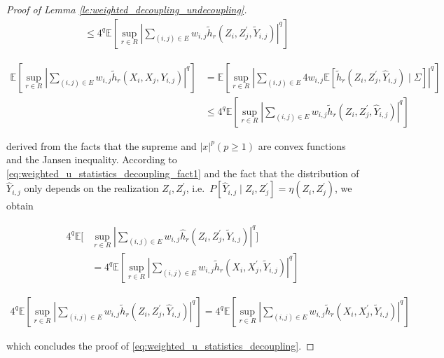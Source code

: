 \documentclass[letterpaper]{article} %
\def\DoubleColumn{}
\def\DoubleColumnEnd{}
\def\SingleColumn{}
\def\SingleColumnEnd{}
\newcommand{\E}{\mathbb{E}}
\newcommand{\Pro}{P}
\newcommand{\pair}[1]{(#1)}
\begin{document}
\begin{proof}[Proof of Lemma \ref{le:weighted_decoupling_undecoupling}]
\begin{align*}
        &\le 4^q\E[\sup_{r\in R}|\sum_{\pair{i,j}\in E}w_{i,j}\tilde{h}_r(Z_i,Z_j^\prime,\tilde{Y}_{i,j})|^q]
    \end{align*}
    \DoubleColumnEnd
    \SingleColumn
    \begin{align*}
        \E[\sup_{r\in R}|\sum_{\pair{i,j}\in E}w_{i,j}\tilde{h}_r(X_i,X_j,Y_{i,j})|^q]&=\E[\sup_{r\in R}|\sum_{\pair{i,j}\in E}4w_{i,j}\E[\tilde{h}_r(Z_i,Z_j^\prime,\hat{Y}_{i,j})\mid\Sigma]|^q]\\
        &\le 4^q\E[\sup_{r\in R}|\sum_{\pair{i,j}\in E}w_{i,j}\tilde{h}_r(Z_i,Z_j^\prime,\hat{Y}_{i,j})|^q]
    \end{align*}
    \SingleColumnEnd
    derived from the facts that the supreme and $|x|^p (p\ge1)$ are convex functions and the Jansen inequality. According to \eqref{eq:weighted_u_statistics_decoupling_fact1} and the fact that the distribution of $\hat{Y}_{i,j}$ only depends on the realization $Z_i,Z_j^\prime$, i.e.\ $\Pro[\hat{Y}_{i,j}\mid Z_i,Z_j^\prime]=\eta(Z_i,Z_j^\prime)$, we obtain
    \DoubleColumn
    \begin{align*}
        4^q\E[&\sup_{r\in R}|\sum_{\pair{i,j}\in E}w_{i,j}\hat{h}_r(Z_i,Z_j^\prime,\tilde{Y}_{i,j})|^q]\\
        &= 4^q\E[\sup_{r\in R}|\sum_{\pair{i,j}\in E}w_{i,j}\tilde{h}_r(X_i,X_j^\prime,\tilde{Y}_{i,j})|^q]
    \end{align*}
    \DoubleColumnEnd
    \SingleColumn
    \begin{align*}
        4^q\E[\sup_{r\in R}|\sum_{\pair{i,j}\in E}w_{i,j}\tilde{h}_r(Z_i,Z_j^\prime,\hat{Y}_{i,j})|^q]= 4^q\E[\sup_{r\in R}|\sum_{\pair{i,j}\in E}w_{i,j}\tilde{h}_r(X_i,X_j^\prime,\tilde{Y}_{i,j})|^q]
    \end{align*}
    \SingleColumnEnd
    which concludes the proof of \eqref{eq:weighted_u_statistics_decoupling}.


\end{proof}
\end{document}
